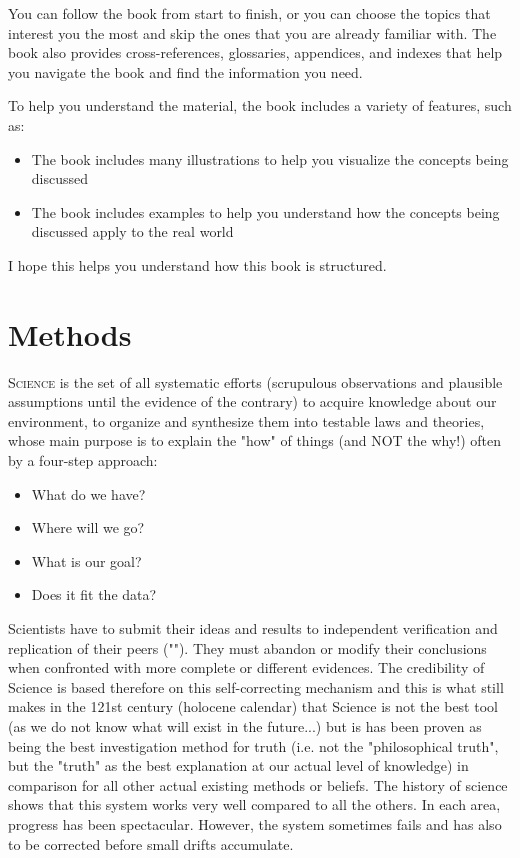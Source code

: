 	You can follow the book from start to finish, or you can choose the topics that interest you the most and skip the ones that you are already familiar with. The book also provides cross-references, glossaries, appendices, and indexes that help you navigate the book and find the information you need.

	To help you understand the material, the book includes a variety of features, such as:
	\begin{itemize}
		\item The book includes many illustrations to help you visualize the concepts being discussed
		
		\item The book includes examples to help you understand how the concepts being discussed apply to the real world
	\end{itemize}
	I hope this helps you understand how this book is structured. 

	\newpage
	\thispagestyle{empty}
	\mbox{}
	\section{Methods}	
	\lettrine[lines=4]{\color{BrickRed}S}{cience} is the set of all systematic efforts (scrupulous observations and plausible assumptions until the evidence of the contrary) to acquire knowledge about our environment, to organize and synthesize them into testable laws and theories, whose main purpose is to explain the "how" of things (and NOT the why!) often by a four-step approach:
	
	\begin{itemize}
		\item What do we have?
		\item Where will we go?
		\item What is our goal?	
		\item Does it fit the data?
	\end{itemize}
	
	Scientists have to submit their ideas and results to independent verification and replication of their peers (""). They must abandon or modify their conclusions when confronted with more complete or different evidences. The credibility of Science is based therefore on this self-correcting mechanism and this is what still makes in the 121st century (holocene calendar) that Science is not the best tool (as we do not know what will exist in the future...) but is has been proven as being the best investigation method for truth (i.e. not the "philosophical truth", but the "truth" as the best explanation at our actual level of knowledge) in comparison for all other actual existing methods or beliefs. The history of science shows that this system works very well compared to all the others. In each area, progress has been spectacular. However, the system sometimes fails and has also to be corrected before small drifts accumulate.

